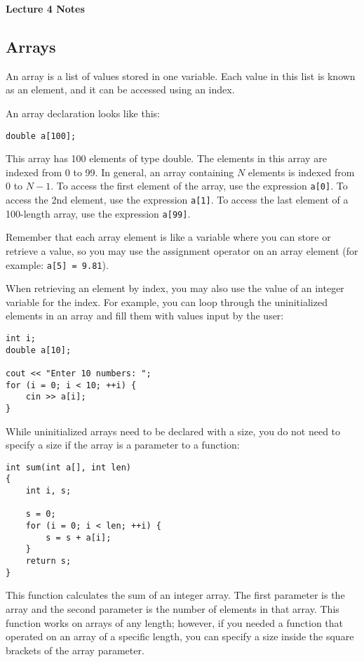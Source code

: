 \documentclass[a4paper,12pt]{article}
\begin{document}
\lstset{frame=single,tabsize=4,basicstyle=\ttfamily}

{\centering \bf \Large
Lecture 4 Notes \\[\baselineskip]
}

\subsection*{Arrays}

An array is a list of values stored in one variable. Each value in this list is known as an element, and it can be accessed using an index. 

An array declaration looks like this:

\begin{lstlisting}
double a[100];
\end{lstlisting}

This array has 100 elements of type double. The elements in this array are indexed from 0 to 99. In general, an array containing $N$ elements is indexed from $0$ to $N - 1$. To access the first element of the array, use the expression \texttt{a[0]}. To access the 2nd element, use the expression \texttt{a[1]}. To access the last element of a 100-length array, use the expression \texttt{a[99]}.

Remember that each array element is like a variable where you can store or retrieve a value, so you may use the assignment operator on an array element (for example: \texttt{a[5] = 9.81}). 

When retrieving an element by index, you may also use the value of an integer variable for the index. For example, you can loop through the uninitialized elements in an array and fill them with values input by the user:

\begin{lstlisting}
int i;
double a[10];

cout << "Enter 10 numbers: ";
for (i = 0; i < 10; ++i) {
	cin >> a[i];
}
\end{lstlisting}

While uninitialized arrays need to be declared with a size, you do not need to specify a size if the array is a parameter to a function:

\begin{lstlisting}
int sum(int a[], int len)
{
	int i, s;

	s = 0;
	for (i = 0; i < len; ++i) {
		s = s + a[i];
	}
	return s;
}
\end{lstlisting}

This function calculates the sum of an integer array. The first parameter is the array and the second parameter is the number of elements in that array. This function works on arrays of any length; however, if you needed a function that operated on an array of a specific length, you can specify a size inside the square brackets of the array parameter.
\end{document}
